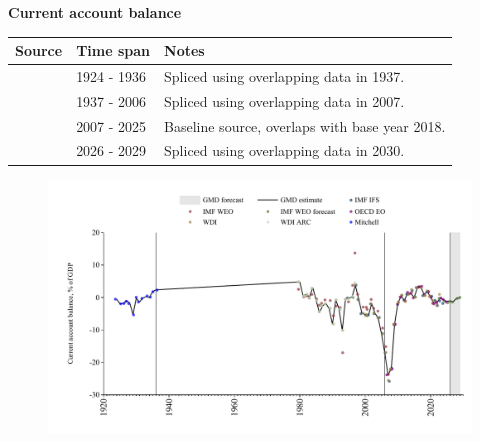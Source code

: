 \documentclass[12pt,a4paper,landscape]{article}
\begin{document}
\begin{adjustbox}{max totalsize={\paperwidth}{\paperheight},center}
\begin{minipage}[t][\textheight][t]{\textwidth}
\vspace*{0.5cm}
{}
\begin{center}
{\Large\bfseries Current account balance}
\end{center}
\vspace{0.5cm}
\begin{table}[H]
\centering
\small
\begin{tabular}{|l|l|l|}
\hline
\textbf{Source} & \textbf{Time span} & \textbf{Notes} \\
\hline
\rowcolor{white}\cite{Mitchell}& 1924 - 1936 &Spliced using overlapping data in 1937. \\
\rowcolor{lightgray}\cite{WDI}& 1937 - 2006 &Spliced using overlapping data in 2007. \\
\rowcolor{white}\cite{OECD_EO}& 2007 - 2025 &Baseline source, overlaps with base year 2018. \\
\rowcolor{lightgray}\cite{IMF_WEO_forecast}& 2026 - 2029 &Spliced using overlapping data in 2030. \\
\hline
\end{tabular}
\end{table}
\begin{figure}[H]
\centering
\includegraphics[width=\textwidth,height=0.6\textheight,keepaspectratio]{graphs/BGR_CA_GDP.pdf}
\end{figure}
\end{minipage}
\end{adjustbox}
\end{document}
